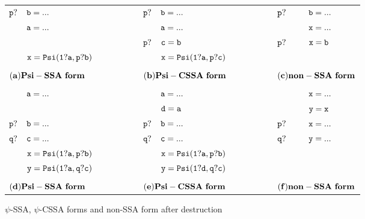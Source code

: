 \begin{figure*}
\begin{center}
\footnotesize
\begin{tabular}{llllllll}
${\tt p?}$ & ${\tt b = ...}$ & \ \ \ \ \ \ \ \  & ${\tt p?}$ & ${\tt b = ...}$ & \ \ \ \ \ \ \ \  & ${\tt p?}$ & ${\tt b = ...}$ \\
            & ${\tt a = ...}$ & \ \ \ \ \ \ \ \  &            & ${\tt a = ...}$ & \ \ \ \ \ \ \ \  &            & ${\tt x = ...}$ \\
            &                 & \ \ \ \ \ \ \ \  & ${\tt p?}$ & ${\tt c = b}$   & \ \ \ \ \ \ \ \  & ${\tt p?}$ & ${\tt x = b}$ \\
            & ${\tt x = Psi(1?a,p?b)}$ & \ \ \ \ \ \ \ \  &   & ${\tt x = Psi(1?a,p?c)}$  & \ \ \ \ \ \ \ \ &   & \\
\\
\multicolumn{2}{l}{${\tt {\bf (a) Psi-SSA\ form}}$} & \ \ \ \ \ \ \ \  &\multicolumn{2}{l}{${\tt {\bf (b) Psi-CSSA\ form}}$} & \ \ \ \ \ \ \ \  &\multicolumn{2}{l}{${\tt {\bf (c) non-SSA\ form}}$} \\
\\
            & ${\tt a = ...}$ & \ \ \ \ \ \ \ \  &            & ${\tt a = ...}$ & \ \ \ \ \ \ \ \  &            & ${\tt x = ...}$ \\
            &                 & \ \ \ \ \ \ \ \  &            & ${\tt d = a}$ & \ \ \ \ \ \ \ \  &            & ${\tt y = x}$ \\
${\tt p?}$ & ${\tt b = ...}$ & \ \ \ \ \ \ \ \  & ${\tt p?}$ & ${\tt b = ...}$ & \ \ \ \ \ \ \ \  & ${\tt p?}$ & ${\tt x = ...}$ \\
${\tt q?}$ & ${\tt c = ...}$ & \ \ \ \ \ \ \ \  & ${\tt q?}$ & ${\tt c = ...}$ & \ \ \ \ \ \ \ \  & ${\tt q?}$ & ${\tt y = ...}$ \\
           & ${\tt x = Psi(1?a,p?b)}$ & \ \ \ \ \ \ \ \  &   & ${\tt x = Psi(1?a,p?b)}$  & \ \ \ \ \ \ \ \ &   & \\
           & ${\tt y = Psi(1?a,q?c)}$ & \ \ \ \ \ \ \ \  &   & ${\tt y = Psi(1?d,q?c)}$  & \ \ \ \ \ \ \ \ &   & \\
\\
\multicolumn{2}{l}{${\tt {\bf (d) Psi-SSA\ form}}$} & \ \ \ \ \ \ \ \  &\multicolumn{2}{l}{${\tt {\bf (e) Psi-CSSA\ form}}$} & \ \ \ \ \ \ \ \  &\multicolumn{2}{l}{${\tt {\bf (f) non-SSA\ form}}$} \\
\end{tabular}
\caption{$\psi$-SSA, $\psi$-CSSA forms and non-SSA form after destruction}
\label{fig:psi-interference}
\end{center}
\end{figure*}

